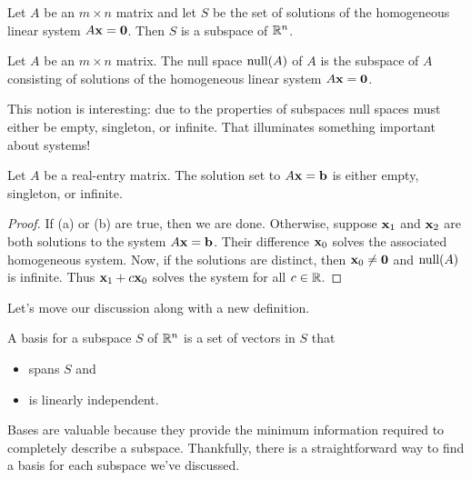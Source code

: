 \documentclass[../m073main.tex]{subfiles}
\begin{document}
\begin{theorem}
	Let $A$ be an $m\times n$ matrix and let $S$ be the set of solutions of the homogeneous linear system $A\mathbf{x} = \mathbf{0}$.
	Then $S$ is a subspace of $\mathbb{R}^n$.
\end{theorem}

\begin{definition}
	Let $A$ be an $m\times n$ matrix.
	The null space $\textrm{null}(A)$ of $A$ is the subspace of $A$ consisting of solutions of the homogeneous linear system $A\mathbf{x} = \mathbf{0}$.
\end{definition}

This notion is interesting: due to the properties of subspaces null spaces must either be empty, singleton, or infinite.
That illuminates something important about systems!

\begin{theorem}
	Let $A$ be a real-entry matrix.
	The solution set to $A \mathbf{x} = \mathbf{b}$ is either empty, singleton, or infinite.
\end{theorem}

\begin{proof}
	If (a) or (b) are true, then we are done.
	Otherwise, suppose $\mathbf{x}_1$ and $\mathbf{x}_2$ are both solutions to the system $A \mathbf{x} = \mathbf{b}$.
	Their difference $\mathbf{x}_0$ solves the associated homogeneous system.
	Now, if the solutions are distinct, then $\mathbf{x}_0 \neq \mathbf{0}$ and $\textrm{null}(A)$ is infinite.
	Thus $\mathbf{x}_1 + c \mathbf{x}_0$ solves the system for all $c \in \mathbb{R}$.
\end{proof}

Let's move our discussion along with a new definition.

\begin{definition}
	A basis for a subspace $S$ of $\mathbb{R}^n$ is a set of vectors in $S$ that
	\begin{itemize}
		\item spans $S$ and
		\item is linearly independent.
	\end{itemize}
\end{definition}

Bases are valuable because they provide the minimum information required to completely describe a subspace.
Thankfully, there is a straightforward way to find a basis for each subspace we've discussed.
\end{document}
